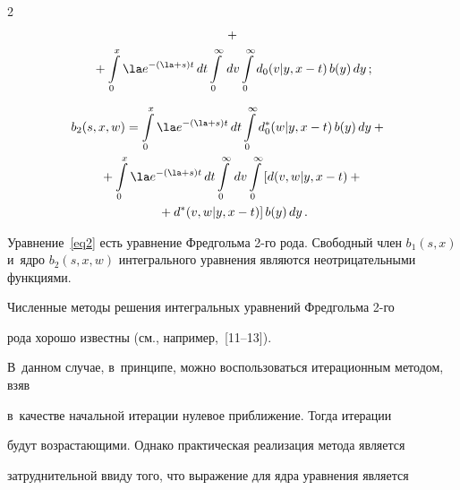 \begin{multicols}{2}
\begin{multline*}
+{}\\


{} +


\int\limits_0^x \la e^{-(\la+s) t}\,dt \int\limits_0^\infty \, dv


\int\limits_0^\infty d_0(v|y,x-t)\, b(y)\, dy\,;


\end{multline*}





\vspace*{-12pt}





\noindent


\begin{multline*}


\hspace*{-5.58406pt}b_2(s,x,w) = \int\limits_0^x \la e^{-(\la+s) t}\,dt


\int\limits_0^\infty d^*_0(w|y,x-t)\, b(y)\, dy +{}


\\


{}+ \int\limits_0^x \la e^{-(\la+s) t}\,dt


\int\limits_0^\infty \, dv


\int\limits_0^\infty \left[ \vphantom{d^*}


d(v,w|y,x-t)+{}\right.\\


\left.{}+d^*(v,w|y,x-t)\right] b(y)\, dy\,.


\end{multline*}





Уравнение~\eqref{eq2} есть уравнение Фредгольма 2-го рода. Свободный член $b_1(s,x)$ и~ядро $b_2(s,x,w)$ интегрального уравнения являются неотрицательными функциями.


Численные методы решения интегральных уравнений Фредгольма 2-го


рода хорошо известны (см., например,~[11--13]).


В~данном случае, в~принципе, можно воспользоваться итерационным методом, взяв


в~качестве начальной итерации нулевое приближение. Тогда итерации


будут возрастающими. Однако практическая реализация метода является


затруднительной ввиду того, что выражение для ядра уравнения является



\end{multicols}
